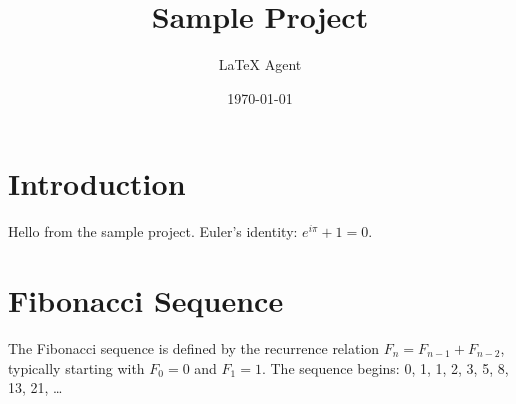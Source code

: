 \documentclass{article}
\title{Sample Project}
\author{LaTeX Agent}
\date{\today}
\begin{document}
\maketitle

\section{Introduction}
Hello from the sample project. Euler's identity: $e^{i\pi} + 1 = 0$.

\section{Fibonacci Sequence}
The Fibonacci sequence is defined by the recurrence relation $F_n = F_{n-1} + F_{n-2}$, typically starting with $F_0 = 0$ and $F_1 = 1$. The sequence begins: 0, 1, 1, 2, 3, 5, 8, 13, 21, \dots
\end{document}
